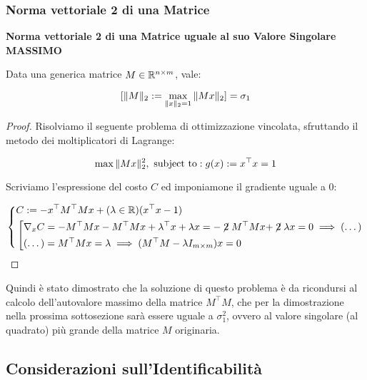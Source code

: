 \subsubsection{Norma vettoriale 2 di una Matrice}

\begin{thrm}{\textbf{Norma vettoriale 2 di una Matrice uguale al suo Valore Singolare MASSIMO}}

Data una generica matrice $M\in\mathbb{R}^{n\times m}$, vale:

\[
	[\lVert M\rVert_2 := \max_{\lVert x\rVert_2=1}{\lVert Mx\rVert_2}] = \sigma_1
\]

\end{thrm}

\begin{proof}

Risolviamo il seguente problema di ottimizzazione vincolata, sfruttando il metodo dei moltiplicatori di Lagrange:

\[
	\max{\lVert Mx\rVert_2^2},\ \text{subject to}: g(x):=x^\top x = 1
\]

Scriviamo l'espressione del costo $C$ ed imponiamone il gradiente uguale a 0:

\[	
	\left\{
	\begin{aligned}
	&C := -x^\top M^\top Mx + (\lambda\in\R)(x^\top x-1)\\
	&\left[
	\begin{aligned}
	&\nabla_x{C} = -M^\top Mx-M^\top Mx + \lambda^\top x+\lambda x = -\centernot{2}M^\top Mx + \centernot{2}\lambda x = 0 \implies (\dots)\\
	&(\dots) = M^\top Mx=\lambda \implies (M^\top M -\lambda I_{m\times m})x = 0
	\end{aligned}
	\right.
	\end{aligned}
	\right.
\]

\end{proof}

Quindi è stato dimostrato che la soluzione di questo problema è da ricondursi al calcolo dell'autovalore massimo della matrice $M^\top M$, che per la dimostrazione nella prossima sottosezione sarà essere uguale a $\sigma_1^2$, ovvero al valore singolare (al quadrato) più grande della matrice $M$ originaria.

\subsection{Considerazioni sull'Identificabilità}

